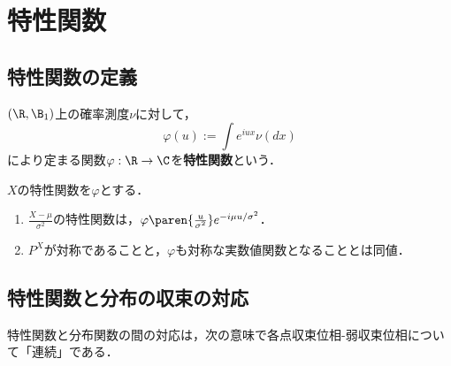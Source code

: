 \documentclass[uplatex,dvipdfmx]{jsreport}
\begin{document}
\section{特性関数}

\subsection{特性関数の定義}

\begin{definition}
    $(\R,\B_1)$上の確率測度$\nu$に対して，
    \[\varphi(u):=\int e^{iux}\nu(dx)\]
    により定まる関数$\varphi:\R\to\C$を\textbf{特性関数}という．
\end{definition}

\begin{proposition}[確率変数の演算との対応]
    $X$の特性関数を$\varphi$とする．
    \begin{enumerate}
        \item $\frac{X-\mu}{\sigma^2}$の特性関数は，$\varphi\paren{\frac{u}{\sigma^2}}e^{-i\mu u/\sigma^2}$．
        \item $P^X$が対称であることと，$\varphi$も対称な実数値関数となることとは同値．
    \end{enumerate}
\end{proposition}

\subsection{特性関数と分布の収束の対応}

\begin{tcolorbox}[colframe=ForestGreen, colback=ForestGreen!10!white,breakable,colbacktitle=ForestGreen!40!white,coltitle=black,fonttitle=\bfseries\sffamily,
title=]
    特性関数と分布関数の間の対応は，次の意味で各点収束位相-弱収束位相について「連続」である．
\end{tcolorbox}
\end{document}
